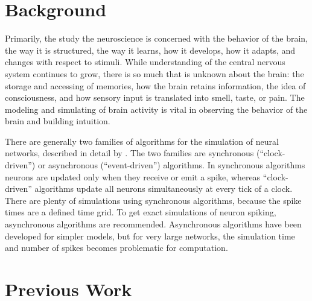 \documentclass[a4paper]{article}
\begin{document}
\section{Background}
Primarily, the study the neuroscience is concerned with the behavior of the brain, the way it is structured, the way it learns, how it develops, how it adapts, and changes with respect to stimuli. While understanding of the central nervous system continues to grow, there is so much that is unknown about the brain: the storage and accessing of memories, how the brain retains information, the idea of consciousness, and how sensory input is translated into smell, taste, or pain. The modeling and simulating of brain activity is vital in observing the behavior of the brain and building intuition.

There are generally two families of algorithms for the simulation of neural networks, described in detail by \cite{spike}. The two families are synchronous (“clock-driven”) or asynchronous (“event-driven”) algorithms. In synchronous algorithms neurons are updated only when they receive or emit a spike, whereas “clock-driven” algorithms update all neurons simultaneously at every tick of a clock. There are plenty of simulations using synchronous algorithms, because the spike times are a defined time grid. To get exact simulations of neuron spiking, asynchronous algorithms are recommended. Asynchronous algorithms have been developed for simpler models, but for very large networks, the simulation time and number of spikes becomes problematic for computation.


\section{Previous Work}
%
\end{document}
